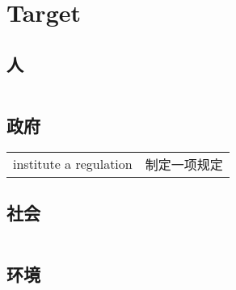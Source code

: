 \section{Target}

\subsection{人}

\begin{tabular}{ll}
\end{tabular}

\subsection{政府}

\begin{tabular}{ll}
    institute a regulation & 制定一项规定 \\
\end{tabular}

\subsection{社会}

\begin{tabular}{ll}
\end{tabular}

\subsection{环境}

\begin{tabular}{ll}
\end{tabular}